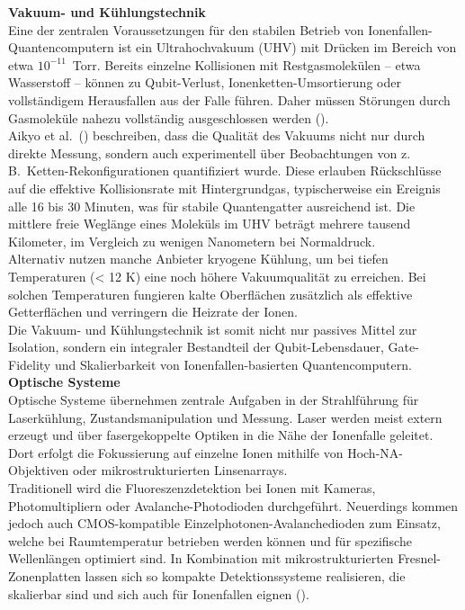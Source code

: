 \textbf{Vakuum- und Kühlungstechnik} \\
Eine der zentralen Voraussetzungen für den stabilen Betrieb von Ionenfallen-Quantencomputern ist ein Ultrahochvakuum (UHV) mit Drücken im Bereich von etwa $10^{-11}$~Torr. Bereits einzelne Kollisionen mit Restgasmolekülen – etwa Wasserstoff – können zu Qubit-Verlust, Ionenketten-Umsortierung oder vollständigem Herausfallen aus der Falle führen. Daher müssen Störungen durch Gasmoleküle nahezu vollständig ausgeschlossen werden (\cite{ionqOurTrappedIon2025}). \\
Aikyo et al.\ (\cite{aikyoVacuumCharacterizationCompact2020}) beschreiben, dass die Qualität des Vakuums nicht nur durch direkte Messung, sondern auch experimentell über Beobachtungen von z.\,B.\ Ketten-Rekonfigurationen quantifiziert wurde. Diese erlauben Rückschlüsse auf die effektive Kollisionsrate mit Hintergrundgas, typischerweise ein Ereignis alle 16 bis 30 Minuten, was für stabile Quantengatter ausreichend ist. Die mittlere freie Weglänge eines Moleküls im UHV beträgt mehrere tausend Kilometer, im Vergleich zu wenigen Nanometern bei Normaldruck. \\
Alternativ nutzen manche Anbieter kryogene Kühlung, um bei tiefen Temperaturen (< 12 K) eine noch höhere Vakuumqualität zu erreichen. Bei solchen Temperaturen fungieren kalte Oberflächen zusätzlich als effektive Getterflächen und verringern die Heizrate der Ionen. \\
Die Vakuum- und Kühlungstechnik ist somit nicht nur passives Mittel zur Isolation, sondern ein integraler Bestandteil der Qubit-Lebensdauer, Gate-Fidelity und Skalierbarkeit von Ionenfallen-basierten Quantencomputern. \\

\textbf{Optische Systeme} \\
Optische Systeme übernehmen zentrale Aufgaben in der Strahlführung für Laserkühlung, Zustandsmanipulation und Messung. Laser werden meist extern erzeugt und über fasergekoppelte Optiken in die Nähe der Ionenfalle geleitet. Dort erfolgt die Fokussierung auf einzelne Ionen mithilfe von Hoch-NA-Objektiven oder mikrostrukturierten Linsenarrays. \\
Traditionell wird die Fluoreszenzdetektion bei Ionen mit Kameras, Photomultipliern oder Avalanche-Photodioden durchgeführt. Neuerdings kommen jedoch auch CMOS-kompatible Einzelphotonen-Avalanchedioden zum Einsatz, welche bei Raumtemperatur betrieben werden können und für spezifische Wellenlängen optimiert sind. In Kombination mit mikrostrukturierten Fresnel-Zonenplatten lassen sich so kompakte Detektionssysteme realisieren, die skalierbar sind und sich auch für Ionenfallen eignen (\cite{chatterjeeIntegratedDetectionOptics2025}). \\

